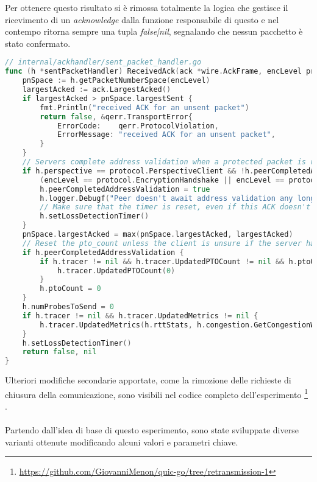 Per ottenere questo risultato si è rimossa totalmente la logica che gestisce il ricevimento di un \emph{acknowledge} dalla funzione responsabile di questo e nel contempo ritorna sempre una tupla \emph{false|nil}, 
segnalando che nessun pacchetto è stato confermato.
\\
\begin{lstlisting}[language=Go]
// internal/ackhandler/sent_packet_handler.go
func (h *sentPacketHandler) ReceivedAck(ack *wire.AckFrame, encLevel protocol.EncryptionLevel, rcvTime time.Time) (bool /* contained 1-RTT packet */, error) { 
    pnSpace := h.getPacketNumberSpace(encLevel)
    largestAcked := ack.LargestAcked()
    if largestAcked > pnSpace.largestSent {
        fmt.Println("received ACK for an unsent packet")
        return false, &qerr.TransportError{
            ErrorCode:    qerr.ProtocolViolation,
            ErrorMessage: "received ACK for an unsent packet",
        }
    }
    // Servers complete address validation when a protected packet is received.
    if h.perspective == protocol.PerspectiveClient && !h.peerCompletedAddressValidation &&
        (encLevel == protocol.EncryptionHandshake || encLevel == protocol.Encryption1RTT) {
        h.peerCompletedAddressValidation = true
        h.logger.Debugf("Peer doesn't await address validation any longer.")
        // Make sure that the timer is reset, even if this ACK doesn't acknowledge any (ack-eliciting) packets.
        h.setLossDetectionTimer()
    }
    pnSpace.largestAcked = max(pnSpace.largestAcked, largestAcked)
    // Reset the pto_count unless the client is unsure if the server has validated the client's address.
	if h.peerCompletedAddressValidation {
		if h.tracer != nil && h.tracer.UpdatedPTOCount != nil && h.ptoCount != 0 {
			h.tracer.UpdatedPTOCount(0)
		}
		h.ptoCount = 0
	}
	h.numProbesToSend = 0
	if h.tracer != nil && h.tracer.UpdatedMetrics != nil {
		h.tracer.UpdatedMetrics(h.rttStats, h.congestion.GetCongestionWindow(), h.bytesInFlight, h.packetsInFlight())
	}
	h.setLossDetectionTimer()
	return false, nil
}
\end{lstlisting}
\noindent Ulteriori modifiche secondarie apportate, come la rimozione delle richieste di chiusura della comunicazione, sono visibili nel codice completo dell'esperimento \footnote{\url{https://github.com/GiovanniMenon/quic-go/tree/retransmission-1}} \cite{site:my-fork}.
\\\\
Partendo dall'idea di base di questo esperimento, sono state sviluppate diverse varianti ottenute modificando alcuni valori e parametri chiave. 
